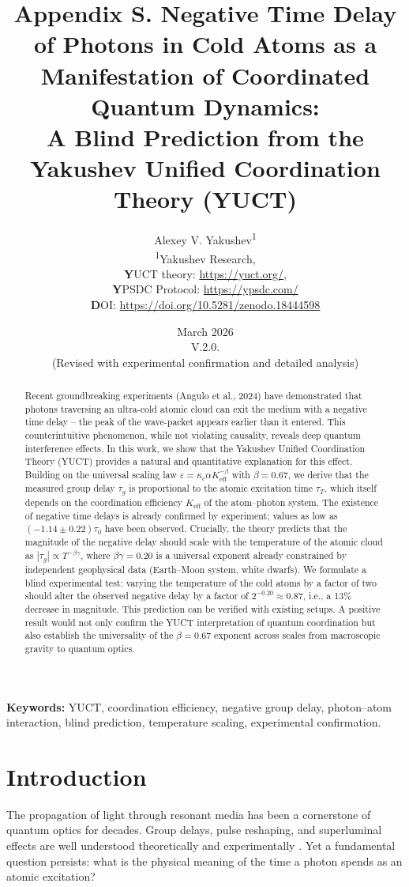 \documentclass[12pt,a4paper]{article}
\title{\textbf{Appendix S. Negative Time Delay of Photons in Cold Atoms as a Manifestation of Coordinated Quantum Dynamics: \\ A Blind Prediction from the Yakushev Unified Coordination Theory (YUCT)}}
\author{Alexey V. Yakushev\textsuperscript{1} \\
	\textsuperscript{1}Yakushev Research, \\ 
	\textbf YUCT theory: \url{https://yuct.org/}, \\ 
	\textbf YPSDC Protocol: \url{https://ypsdc.com/}\\
	\textbf DOI: \url{https://doi.org/10.5281/zenodo.18444598}\\
}
\date{March 2026 \\ \large V.2.0. \\(Revised with experimental confirmation and detailed analysis)}
\newcommand{\Keff}{K_{\mathrm{eff}}}
\newcommand{\kappac}{\kappa_c}
\newcommand{\eps}{\varepsilon}
\newcommand{\betagamma}{\beta\gamma}
\newcommand{\betac}{\beta}
\begin{document}
	
	\maketitle
	\newpage
	\begin{abstract}
		Recent groundbreaking experiments (Angulo et al., 2024) have demonstrated that photons traversing an ultra-cold atomic cloud can exit the medium with a negative time delay – the peak of the wave-packet appears earlier than it entered. This counterintuitive phenomenon, while not violating causality, reveals deep quantum interference effects. In this work, we show that the Yakushev Unified Coordination Theory (YUCT) provides a natural and quantitative explanation for this effect. Building on the universal scaling law \(\eps = \kappac \alpha \Keff^{-\betac}\) with \(\betac = 0.67\), we derive that the measured group delay \(\tau_g\) is proportional to the atomic excitation time \(\tau_T\), which itself depends on the coordination efficiency \(\Keff\) of the atom–photon system. The existence of negative time delays is already confirmed by experiment; values as low as \((-1.14 \pm 0.22)\tau_0\) have been observed. Crucially, the theory predicts that the magnitude of the negative delay should scale with the temperature of the atomic cloud as \(|\tau_g| \propto T^{-\betagamma}\), where \(\betagamma = 0.20\) is a universal exponent already constrained by independent geophysical data (Earth–Moon system, white dwarfs). We formulate a blind experimental test: varying the temperature of the cold atoms by a factor of two should alter the observed negative delay by a factor of \(2^{-0.20} \approx 0.87\), i.e., a 13\% decrease in magnitude. This prediction can be verified with existing setups. A positive result would not only confirm the YUCT interpretation of quantum coordination but also establish the universality of the \(\betac = 0.67\) exponent across scales from macroscopic gravity to quantum optics.
	\end{abstract}
	
	\noindent\textbf{Keywords:} YUCT, coordination efficiency, negative group delay, photon–atom interaction, blind prediction, temperature scaling, experimental confirmation.
	
	\newpage
	\tableofcontents
	\newpage
	
	\section{Introduction}
	
	The propagation of light through resonant media has been a cornerstone of quantum optics for decades. Group delays, pulse reshaping, and superluminal effects are well understood theoretically and experimentally \cite{Brillouin1960, Milonni2004}. Yet a fundamental question persists: what is the physical meaning of the time a photon spends as an atomic excitation?
	
\end{document}
